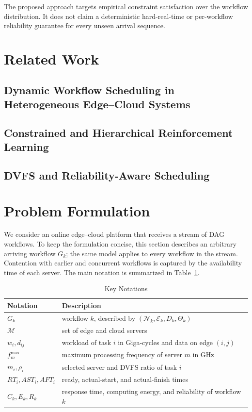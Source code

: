 \documentclass[lettersize,journal]{IEEEtran}
\begin{document}
The proposed approach targets empirical constraint satisfaction over the
workflow distribution. It does not claim a deterministic hard-real-time or
per-workflow reliability guarantee for every unseen arrival sequence.

\section{Related Work}
\label{sec:related_work}

\subsection{Dynamic Workflow Scheduling in Heterogeneous Edge--Cloud Systems}

\subsection{Constrained and Hierarchical Reinforcement Learning}

\subsection{DVFS and Reliability-Aware Scheduling}

\section{Problem Formulation}
\label{sec:problem_formulation}

We consider an online edge--cloud platform that receives a stream of DAG
workflows. To keep the formulation concise, this section describes an
arbitrary arriving workflow $G_k$; the same model applies to every workflow in
the stream. Contention with earlier and concurrent workflows is captured by
the availability time of each server. The main notation is summarized in
Table~\ref{tab:key_notations}.

\begin{table}[t]
    \centering
    \caption{Key Notations}
    \label{tab:key_notations}
    \renewcommand{\arraystretch}{1.08}
    \begin{tabular}{@{}p{}p{}@{}}
        \toprule
        Notation & Description \\
        \midrule
        $G_k$ & workflow $k$, described by $(\mathcal{N}_k,\mathcal{E}_k,D_k,\Theta_k)$ \\
        $\mathcal{M}$ & set of edge and cloud servers \\
        $w_i,d_{ij}$ & workload of task $i$ in Giga-cycles and data on edge $(i,j)$ \\
        $f_m^{\max}$ & maximum processing frequency of server $m$ in GHz \\
        $m_i,\rho_i$ & selected server and DVFS ratio of task $i$ \\
        $RT_i,AST_i,AFT_i$ & ready, actual-start, and actual-finish times \\
        $C_k,E_k,R_k$ & response time, computing energy, and reliability of workflow $k$ \\
        \bottomrule
    \end{tabular}
\end{table}
\end{document}

